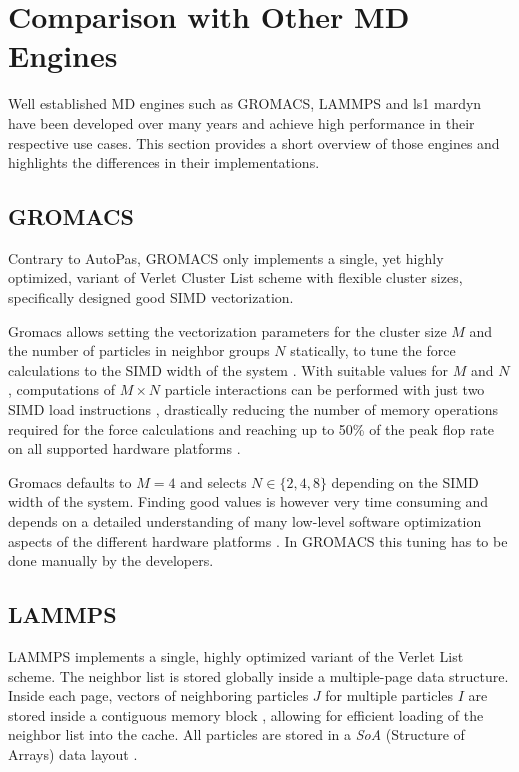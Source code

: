 \documentclass[conference]{IEEEtran}
\begin{document}
\section{Comparison with Other MD Engines}

Well established MD engines such as GROMACS, LAMMPS and ls1 mardyn have been developed over many years and achieve high performance in their respective use cases. This section provides a short overview of those engines and highlights the differences in their implementations.

\subsection{GROMACS}

Contrary to AutoPas, GROMACS only implements a single, yet highly optimized, variant of Verlet Cluster List scheme with flexible cluster sizes, specifically designed good SIMD vectorization.

Gromacs allows setting the vectorization parameters for the cluster size $M$ and the number of particles in neighbor groups $N$ statically, to tune the force calculations to the SIMD width of the system \cite{PALL20132641}. With suitable values for $M$ and $N$, computations of $M \times N$ particle interactions can be performed with just two SIMD load instructions \cite{Solving_Software_Challenges_Exascale_2014}, drastically reducing the number of memory operations required for the force calculations and reaching up to 50\% of the peak flop rate on all supported hardware platforms \cite{Solving_Software_Challenges_Exascale_2014}.

Gromacs defaults to $M=4$ and selects $N \in \{2, 4, 8\}$ depending on the SIMD width of the system. Finding good values is however very time consuming and depends on a detailed understanding of many low-level software optimization aspects of the different hardware platforms \cite{PALL20132641}. In GROMACS this tuning has to be done manually by the developers.

\subsection{LAMMPS}

LAMMPS implements a single, highly optimized variant of the Verlet List scheme. The neighbor list is stored globally inside a multiple-page data structure. Inside each page, vectors of neighboring particles $J$ for multiple particles $I$ are stored inside a contiguous memory block \cite{THOMPSON2022108171}, allowing for efficient loading of the neighbor list into the cache.
All particles are stored in a \textit{SoA} (Structure of Arrays) data layout \cite{THOMPSON2022108171}.
\end{document}
